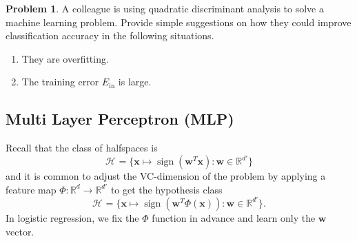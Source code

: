 \documentclass[10pt]{exam}
\theoremstyle{definition}
\newtheorem{problem}{Problem}
\newtheorem{note}{Note}
\newcommand{\R}{\mathbb R}
\DeclareMathOperator{\sign}{sign}
\newcommand{\Ein}{E_{\text{in}}}
\newcommand{\trans}[1]{{#1}^{T}}
\newcommand{\w}{\mathbf w}
\newcommand{\x}{\mathbf x}
\newcommand{\HH}[1]{\mathcal H_{\text{#1}}}
\begin{document}



\newpage
\begin{problem}
    A colleague is using quadratic discriminant analysis to solve a machine learning problem.
    Provide simple suggestions on how they could improve classification accuracy in the following situations.
    \begin{enumerate}
        \item
            They are overfitting.
            \vspace{4in}
        \item
            The training error $\Ein$ is large.
    \end{enumerate}
\end{problem}


\newpage
\subsection{Multi Layer Perceptron (MLP)}

Recall that the class of halfspaces is
\begin{equation}
    \HH{} = \bigg\{ \x \mapsto \sign(\trans\w \x) : \w \in \R^{d'} \bigg\}
\end{equation}
and it is common to adjust the VC-dimension of the problem by applying a feature map
$\Phi : \R^d \to \R^{d'}$ to get the hypothesis class
\begin{equation}
    \HH{} = \bigg\{ \x \mapsto \sign(\trans\w \Phi(\x)) : \w \in \R^{d'} \bigg\}
    .
\end{equation}
In logistic regression, we fix the $\Phi$ function in advance and learn only the $\w$ vector.
\end{document}
